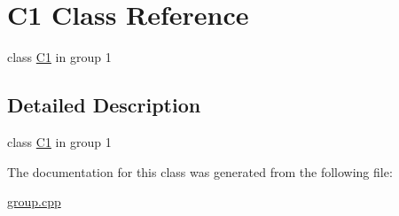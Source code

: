 \hypertarget{class_c1}{\section{C1 Class Reference}
\label{class_c1}
}


class \hyperlink{class_c1}{C1} in group 1  




\subsection{Detailed Description}
class \hyperlink{class_c1}{C1} in group 1 

The documentation for this class was generated from the following file\-:\begin{DoxyCompactItemize}
\item 
\hyperlink{group_8cpp}{group.\-cpp}\end{DoxyCompactItemize}
